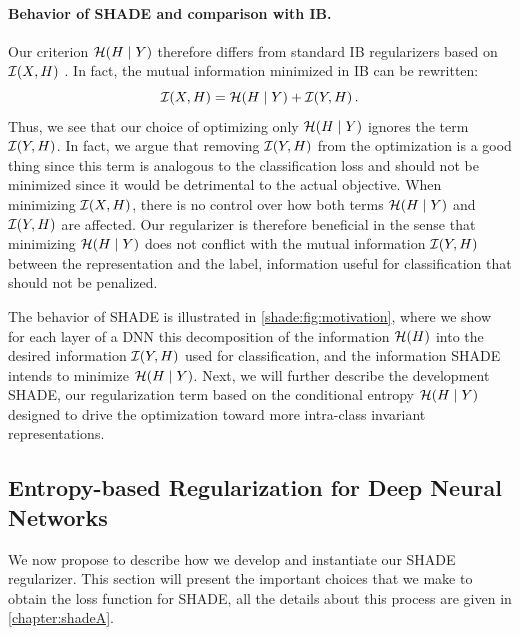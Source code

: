         \paragraph{Behavior of \ac{SHADE} and comparison with \ac{IB}.} Our criterion $\mathcal{H}(H\mid Y)$ therefore differs from standard \ac{IB} regularizers based on $\mathcal{I}(X, H)$
        \citep[\eg\unskip][]{Achille2016, IBvariational}.
        In fact, the mutual information minimized in \ac{IB} can be rewritten:
        \begin{equation}\label{shade:eq:IB}
            \mathcal{I}(X, H) = \mathcal{H}(H\mid Y) + \mathcal{I}(Y, H) \,.
        \end{equation}
        Thus, we see that our choice of optimizing only $\mathcal{H}(H\mid Y)$ ignores the term $\mathcal{I}(Y, H)$.  In fact, we argue that removing $\mathcal{I}(Y, H)$ from the optimization is a good thing since this term is analogous to the classification loss and should not be minimized since it would be detrimental to the actual objective.
        When minimizing $\mathcal{I}(X, H)$, there is no control over how both terms $\mathcal{H}(H\mid Y)$ and $\mathcal{I}(Y, H)$ are affected. 
        Our regularizer is therefore beneficial in the sense that minimizing $\mathcal{H}(H\mid Y)$ does not conflict with  the mutual information $\mathcal{I}(Y, H)$ between the representation and the label, information useful for classification that should not be penalized.

        The behavior of \ac{SHADE} is illustrated in \autoref{shade:fig:motivation}, where we show for each layer of a \ac{DNN} this decomposition of the information $\mathcal{H}(H)$ into the desired information $\mathcal{I}(Y, H)$ used for classification, and the information \ac{SHADE} intends to minimize $\mathcal{H}(H\mid Y)$. Next, we will further describe the development \ac{SHADE}, our regularization term based on the conditional entropy $\mathcal{H}(H\mid Y)$ designed to drive the optimization toward more intra-class invariant representations.

 \subsection{Entropy-based Regularization for Deep Neural Networks} \label{shade:sec:dev}
 \label{shade:sec:noncond_entropy}

    We now propose to describe how we develop and instantiate our \ac{SHADE} regularizer. This section will present the important choices that we make to obtain the loss function for \ac{SHADE}, all the details about this process are given in \autoref{chapter:shadeA}.


